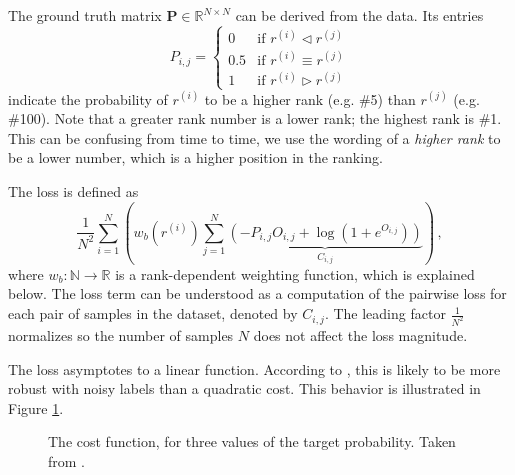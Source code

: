 The ground truth matrix $\bm{P}\in\mathbb{R}^{N\times N}$ can be derived from the data. Its entries\begin{equation}\label{eq:groundtruthmatrix}
    P_{i,j}=\begin{cases}
        0&\text{if }r^{(i)}\triangleleft r^{(j)}\\
        0.5&\text{if }r^{(i)}\equiv r^{(j)}\\
        1&\text{if }r^{(i)}\triangleright r^{(j)}
    \end{cases}
\end{equation}indicate the probability of $r^{(i)}$ to be a higher rank (e.g. \#5) than $r^{(j)}$ (e.g. \#100). Note that a greater rank number is a lower rank; the highest rank is \#1. This can be confusing from time to time, we use the wording of a \textit{higher rank} to be a lower number, which is a higher position in the ranking.

The loss is defined as
\begin{equation}
    \label{eq:loss}
    \frac{1}{N^2}\sum_{i=1}^N\left(
        w_b\left(r^{(i)}\right)\sum_{j=1}^N
            \underbrace{\left(-P_{i,j}O_{i,j}+\log\left(1+e^{O_{i,j}}\right)\right)}_{C_{i,j}}
    \right)\,,
\end{equation}where $w_b:\mathbb{N}\rightarrow\mathbb{R}$ is a rank-dependent weighting function, which is explained below. The loss term can be understood as a computation of the pairwise loss for each pair of samples in the dataset, denoted by $C_{i,j}$. The leading factor $\frac{1}{N^2}$ normalizes so the number of samples $N$ does not affect the loss magnitude.

The loss asymptotes to a linear function. According to \cite{Burges:learningtorankwithsgd}, this is likely to be more robust with noisy labels than a quadratic cost. This behavior is illustrated in Figure \ref{fig:costfn}.

\begin{figure}\centering
    \caption[The cost function, for three values of the target probability]{The cost function, for three values of the target probability. Taken from \cite{Burges:learningtorankwithsgd}.}\label{fig:costfn}
\end{figure}

